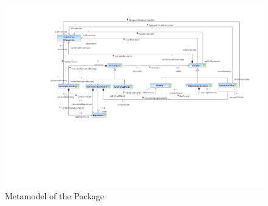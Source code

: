 %
%

\begin{figure}[htbp]
  \centering
  \includegraphics[width=\textheight,angle=90]{figures/A_technical-reference/packages/storydiagrams_calls/calls}
  \caption{Metamodel of the  Package}
  \label{fig:MM:calls}
\end{figure}
